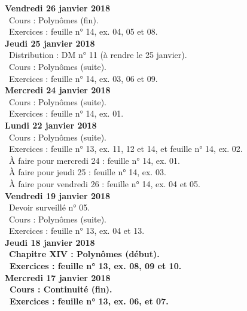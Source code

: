 \documentclass[12pt,a4paper]{article}
\begin{document}
\noindent\textbf{Vendredi 26 janvier 2018}\\
\bu\ Cours : Polynômes (fin).\\
\bu\ Exercices : feuille n° 14, ex. 04, 05 et 08.\vspace{.4cm}\\

\noindent\textbf{Jeudi 25 janvier 2018}\\
\bu\ Distribution : DM n° 11 (à rendre le 25 janvier).\\
\bu\ Cours : Polynômes (suite).\\
\bu\ Exercices : feuille n° 14, ex. 03, 06 et 09.\vspace{.4cm}\\

\noindent\textbf{Mercredi 24 janvier 2018} \\
\bu\ Cours : Polynômes (suite).\\
\bu\ Exercices : feuille n° 14, ex. 01.\vspace{.4cm}\\

\noindent\textbf{Lundi 22 janvier 2018} \\
\bu\ Cours : Polynômes (suite).\\
\bu\ Exercices : feuille n° 13, ex. 11, 12 et 14, et feuille n° 14, ex. 02.\\
\bu\ À faire pour mercredi 24 : feuille n° 14, ex. 01.\\
\bu\ À faire pour jeudi 25 : feuille n° 14, ex. 03.\\
\bu\ À faire pour vendredi 26 : feuille n° 14, ex. 04 et 05.\vspace{.4cm}\\

\noindent\textbf{Vendredi 19 janvier 2018}\\
\bu\ Devoir surveillé n° 05.\\
\bu\ Cours : Polynômes (suite).\\
\bu\ Exercices : feuille n° 13, ex. 04 et 13.\vspace{.4cm}\\

\noindent\textbf{Jeudi 18 janvier 2018}\\
\bu\ \bf Chapitre XIV \rm : Polynômes (début).\\
\bu\ Exercices : feuille n° 13, ex. 08, 09 et 10.\vspace{.4cm}\\

\noindent\textbf{Mercredi 17 janvier 2018} \\
\bu\ Cours : Continuité (fin).\\
\bu\ Exercices : feuille n° 13, ex. 06, et 07.\vspace{.4cm}\\
\end{document}
